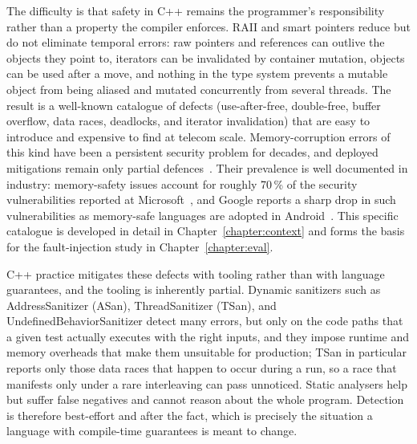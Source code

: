 \documentclass[english,twoside,openright,a4paper,censored,csm,software-track-2020]{HYthesisML}
\begin{document}
The difficulty is that safety in C++ remains the programmer's responsibility rather than a
property the compiler enforces. RAII and smart pointers reduce but do not eliminate temporal
errors: raw pointers and references can outlive the objects they point to, iterators can be
invalidated by container mutation, objects can be used after a move, and nothing in the type
system prevents a mutable object from being aliased and mutated concurrently from several
threads. The result is a well-known catalogue of defects (use-after-free, double-free,
buffer overflow, data races, deadlocks, and iterator invalidation) that are easy to
introduce and expensive to find at telecom scale. Memory-corruption errors of this kind have
been a persistent security problem for decades, and deployed mitigations remain only partial
defences~\cite{szekeres2013sok}. Their prevalence is well documented in
industry: memory-safety issues account for roughly 70\,\% of the security vulnerabilities
reported at Microsoft~\cite{msrc2019memory}, and Google reports a sharp drop in such
vulnerabilities as memory-safe languages are adopted in Android~\cite{google2022android}. This
specific catalogue is developed in detail in Chapter~\ref{chapter:context} and forms the basis
for the fault-injection study in Chapter~\ref{chapter:eval}.

C++ practice mitigates these defects with tooling rather than with language guarantees, and
the tooling is inherently partial. Dynamic sanitizers such as AddressSanitizer (ASan),
ThreadSanitizer (TSan), and UndefinedBehaviorSanitizer detect many errors, but only on the
code paths that a given test actually executes with the right inputs, and they impose runtime
and memory overheads that make them unsuitable for production; TSan in particular reports only
those data races that happen to occur during a run, so a race that manifests only under a rare
interleaving can pass unnoticed. Static analysers help but suffer false negatives and cannot
reason about the whole program. Detection is therefore best-effort and after the fact, which
is precisely the situation a language with compile-time guarantees is meant to change.
\end{document}
